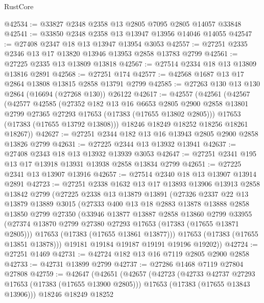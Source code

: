\begin{lexlean}{RustCore}
\begin{coremodule}
@42534 := @33827 @2348 @2358 @13 @2805 @7095 @2805 @14057 @33848
@42541 := @33850 @2348 @2358 @13 @13947 @13956 @14046 @14055
@42547 := @27408 @2347 @18 @13 @13947 @13954 @3053
@42557 := @27251 @2335 @2346 @13 @17 @13820 @13946 @13953 @2858 @13783 @2799
@42561 := @27225 @2335 @13 @13809 @13818
@42567 := @27514 @2334 @18 @13 @13809 @13816 @2891
@42568 := @27251 @174
@42577 := @42568 @1687 @13 @17 @2864 @13808 @13815 @2858 @13791 @2799
@42585 := @27263 @130 @13 @130 @2864 (@16694 (@27268 @130)) @26122
@42617 := @42557
    (@42561
      (@42567
        (@42577
          @42585
          (@27352
            @182
            @13
            @16
            @6653
            @2805
            @2900
            @2858
            @13801
            @2799
            @27365
            @27293
            @17653
            (@17383 (@17655 @13802 @2805)))
          @17653
          (@17383 (@17655 @13792 @13808)))
        @18246
        @18249
        @18252
        @18256
        @18261
        @18267))
@42627 := @27251 @2344 @182 @13 @16 @13943 @2805 @2900 @2858 @13826 @2799
@42631 := @27225 @2344 @13 @13932 @13941
@42637 := @27408 @2343 @18 @13 @13932 @13939 @3053
@42647 := @27251 @2341 @195 @13 @17 @13918 @13931 @13938 @2858 @13834 @2799
@42651 := @27225 @2341 @13 @13907 @13916
@42657 := @27514 @2340 @18 @13 @13907 @13914 @2891
@42723 := @27251
    @2338
    @1632
    @13
    @17
    @13893
    @13906
    @13913
    @2858
    @13842
    @2799
    (@27225
      @2338
      @13
      @13879
      @13891
      (@27326
        @2337
        @22
        @13
        @13879
        @13889
        @3015
        (@27333
          @400
          @13
          @18
          @2883
          @13878
          @13888
          @2858
          @13850
          @2799
          @27350
          (@33946
            @13877
            @13887
            @2858
            @13860
            @2799
            @33955
            (@27374 @13870 @2799 @27380 @27293 @17653 (@17383 (@17655 @13871 @2805)))
            @17653
            (@17383 (@17655 @13861 @13877)))
          @17653
          (@17383 (@17655 @13851 @13878)))
        @19181
        @19184
        @19187
        @19191
        @19196
        @19202))
@42724 := @27251 @1469
@42731 := @42724 @182 @13 @16 @7119 @2805 @2900 @2858
@42733 := @42731 @13899 @2799
@42737 := @27286 @1468 @7119 @27804 @27808
@42759 := @42647
    (@42651
      (@42657
        (@42723
          (@42733 @42737 @27293 @17653 (@17383 (@17655 @13900 @2805)))
          @17653
          (@17383 (@17655 @13843 @13906)))
        @18246
        @18249
        @18252

\end{coremodule}
\end{lexlean}
